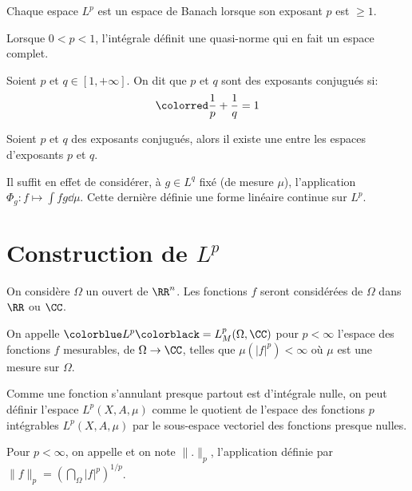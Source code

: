 \medskip
\begin{theoreme}
Chaque espace $L^p$ est un espace de Banach lorsque son exposant $p$ est $\ge 1$.
\end{theoreme}

\begin{theoreme}
Lorsque $0 < p < 1$, l'intégrale définit une quasi-norme qui en fait un espace complet.
\end{theoreme}


\medskip
\begin{definition}
Soient $p$ et $q\in [1,+\infty]$. On dit que $p$ et $q$ sont des exposants conjugués si:
\begin{equation}\colorred\dfrac1p + \dfrac1q = 1 \end{equation}
\end{definition}

\begin{theoreme}
Soient $p$ et $q$ des exposants conjugués, alors il existe une  entre les espaces d'exposants $p$ et $q$.
\end{theoreme}
Il suffit en effet de considérer, à $g\in L^q$ fixé (de mesure $\mu$), l'application $\Phi_g: f\mapsto \int fg\dd\mu$. Cette dernière
définie une forme linéaire continue sur $L^p$.

\medskip
\section{Construction de $L^p$}

On considère $\Omega$ un ouvert de $\RR^n$.
Les fonctions $f$ seront considérées de $\Omega$  dans $\RR$ ou $\CC$.

\medskip
On appelle $\colorblue L^p \colorblack= L^p_M(\Omega,\CC)$ pour $p<\infty$
l'espace des fonctions $f$ mesurables, de $\Omega \rightarrow \CC$, telles que
$\mu(|f|^p)<\infty$ où $\mu$ est une mesure sur $\Omega$.

\medskip
Comme une fonction s'annulant presque partout est d'intégrale nulle, on peut définir
l'espace $L^p(X,A,\mu)$ comme le quotient de l'espace des fonctions $p$ intégrables
$L^p(X,A,\mu)$ par le sous-espace vectoriel des fonctions presque nulles.


\medskip
\begin{definition}[Norme $L^p$]
Pour $p<\infty$, on appelle  et on note $\|.\|_p$,
l'application définie par $\|f\|_p=\left(\dint_\Omega |f|^p\right)^{1/p}$.
\end{definition}

